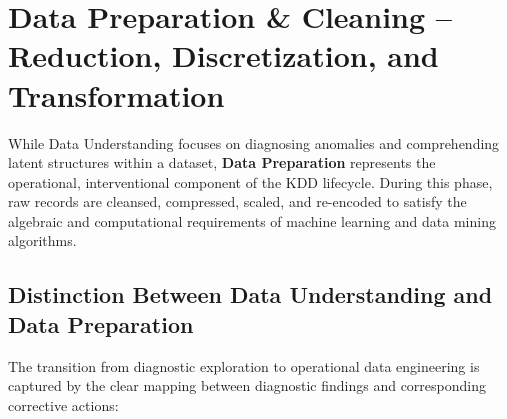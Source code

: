 \chapter{Data Preparation \& Cleaning -- Reduction, Discretization, and Transformation}
\label{chap:dm-data-preparation-cleaning}

While Data Understanding focuses on diagnosing anomalies and comprehending latent structures within a dataset, \textbf{Data Preparation} represents the operational, interventional component of the KDD lifecycle. During this phase, raw records are cleansed, compressed, scaled, and re-encoded to satisfy the algebraic and computational requirements of machine learning and data mining algorithms.

\section{Distinction Between Data Understanding and Data Preparation}
\label{sec:dm-du-vs-dp}

The transition from diagnostic exploration to operational data engineering is captured by the clear mapping between diagnostic findings and corresponding corrective actions:


